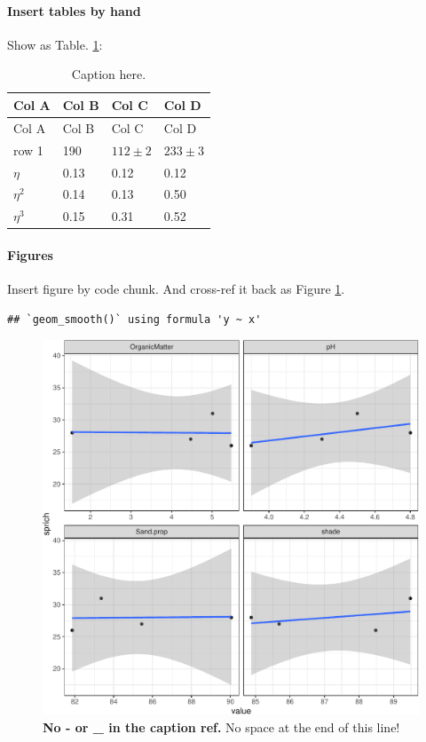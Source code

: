\documentclass[
  12pt,
]{article}
\begin{document}
\hypertarget{insert-tables-by-hand}{%
\paragraph{Insert tables by hand}\label{insert-tables-by-hand}}

Show as Table. \ref{tab:byhand}:

\begin{longtable}[]{@{}llll@{}}
\caption{\label{tab:byhand} Caption here.}\tabularnewline
\toprule
Col A & Col B & Col C & Col D\tabularnewline
\midrule
\endfirsthead
\toprule
Col A & Col B & Col C & Col D\tabularnewline
\midrule
\endhead
row 1 & 190 & \(112 \pm 2\) & \(233 \pm 3\)\tabularnewline
\(\eta\) & 0.13 & 0.12 & 0.12\tabularnewline
\(\eta^2\) & 0.14 & 0.13 & 0.50\tabularnewline
\(\eta^3\) & 0.15 & 0.31 & 0.52\tabularnewline
\bottomrule
\end{longtable}

\hypertarget{figures}{%
\paragraph{Figures}\label{figures}}

Insert figure by code chunk. And cross-ref it back as Figure \ref{fig:figName}.



\begin{verbatim}
## `geom_smooth()` using formula 'y ~ x'
\end{verbatim}

\begin{figure}[H]

{\centering \includegraphics{ms_files/figure-latex/figName-1} 

}

\caption{\textbf{No - or \_ in the caption ref.} No space at the end of this line!}\label{fig:figName}
\end{figure}
\end{document}
